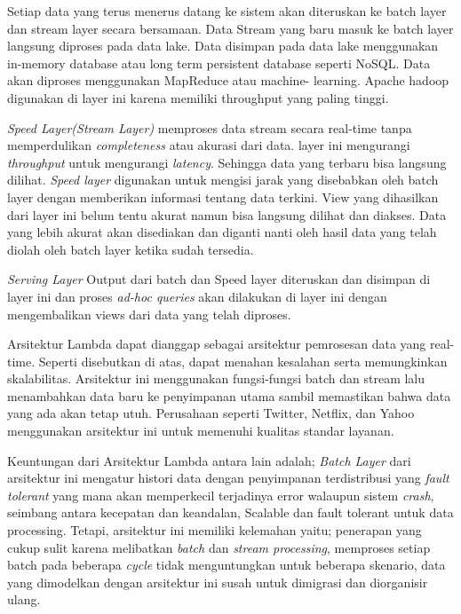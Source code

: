 \documentclass[a4paper,twoside]{article}
\begin{document}
\begin{enumerate}
		Setiap data yang terus menerus datang ke sistem akan diteruskan ke batch layer dan stream 				layer secara bersamaan. Data Stream yang baru masuk ke batch layer langsung diproses pada 				data lake. Data disimpan pada data lake menggunakan in-memory database atau long term 					persistent database seperti NoSQL. Data akan diproses menggunakan MapReduce atau machine-				learning. Apache hadoop digunakan di layer ini karena memiliki throughput yang paling 					tinggi.
		
		\textit{Speed Layer(Stream Layer)} memproses data stream secara real-time tanpa 						 memperdulikan \textit{completeness} atau akurasi dari data. layer ini mengurangi 						\textit{throughput} untuk mengurangi \textit{latency}. Sehingga data yang terbaru bisa 					langsung dilihat. \textit{Speed layer} digunakan untuk mengisi jarak yang disebabkan oleh 				batch layer dengan memberikan informasi tentang data terkini. View yang dihasilkan dari 				layer ini belum tentu akurat namun bisa langsung dilihat dan diakses. Data yang lebih 					akurat akan disediakan dan diganti nanti oleh hasil data yang telah diolah oleh batch layer 			ketika sudah tersedia.
		
		\textit{Serving Layer} Output dari batch dan Speed layer diteruskan dan disimpan di layer 				ini dan proses \textit{ad-hoc queries} akan dilakukan di layer ini dengan mengembalikan 				views dari data yang telah diproses.
		
		Arsitektur Lambda dapat dianggap sebagai arsitektur pemrosesan data yang real-time. Seperti 			disebutkan di atas, dapat menahan kesalahan serta memungkinkan skalabilitas. Arsitektur ini 			menggunakan fungsi-fungsi batch dan stream lalu menambahkan data baru ke penyimpanan utama 				sambil memastikan bahwa data yang ada akan tetap utuh. Perusahaan seperti Twitter, Netflix, 			dan Yahoo menggunakan arsitektur ini untuk memenuhi kualitas standar layanan.
		
		
		Keuntungan dari Arsitektur Lambda antara lain adalah; \textit{Batch Layer} dari arsitektur 				ini mengatur histori data dengan penyimpanan terdistribusi yang \textit{fault tolerant} yang 		mana akan memperkecil terjadinya error walaupun sistem \textit{crash}, seimbang antara 					kecepatan dan keandalan, Scalable dan fault tolerant untuk data processing. Tetapi, 					arsitektur ini memiliki kelemahan yaitu; penerapan yang cukup sulit karena melibatkan 					\textit{batch} dan \textit{stream processing}, memproses setiap batch pada beberapa 					\textit{cycle} tidak menguntungkan untuk beberapa skenario, data yang dimodelkan dengan 				arsitektur ini susah untuk dimigrasi dan diorganisir ulang.
		

\end{enumerate}
\end{document}
